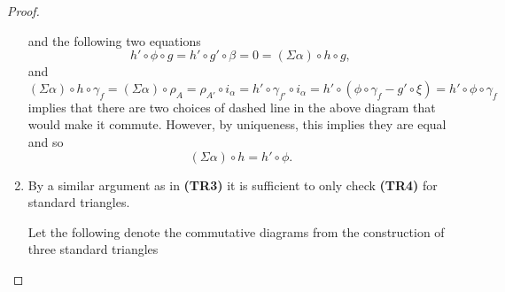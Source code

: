 \begin{proof}
\begin{enumerate}[label={(\bfseries TR\arabic*)}]
{\begin{center}
            \end{center}
            and the following two equations
            \[
                h' \circ \phi \circ g = h' \circ g' \circ \beta = 0 = (\Sigma \alpha) \circ h \circ g,
            \]
            and
            \[
                (\Sigma \alpha) \circ h \circ \gamma_f = (\Sigma \alpha) \circ \rho_A = \rho_{A'} \circ i_{\alpha} = h' \circ \gamma_{f'} \circ i_{\alpha} = h' \circ (\phi \circ \gamma_f - g' \circ \xi) = h' \circ \phi \circ \gamma_f
            \]
            implies that there are two choices of dashed line in the above diagram that would make it commute. However, by uniqueness, this implies they are equal and so
            \[
                (\Sigma \alpha) \circ h = h' \circ \phi.
            \]
        }
        \item {
            By a similar argument as in {\bf (TR3)} it is sufficient to only check {\bf (TR4)} for standard triangles.

            Let the following denote the commutative diagrams from the construction of three standard triangles
            \begin{center}
\end{center}}
\end{enumerate}
\end{proof}
